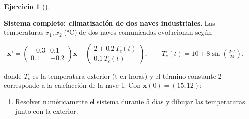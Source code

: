 \documentclass[
  spanish,
  a4paper,
]{scrreport}
\theoremstyle{definition}
\newtheorem{exercise}{Ejercicio}[chapter]
\theoremstyle{remark}
\begin{document}
\begin{exercise}[]\protect\hypertarget{exr-sistema-completo-climatizacion}{}\label{exr-sistema-completo-climatizacion}

\textbf{Sistema completo: climatización de dos naves industriales.} Las
temperaturas \(x_1, x_2\) (°C) de dos naves comunicadas evolucionan
según

\[
\mathbf{x}' = \begin{pmatrix} -0.3 & 0.1 \\ 0.1 & -0.2 \end{pmatrix} \mathbf{x}
+ \begin{pmatrix} 2 + 0.2\,T_e(t) \\ 0.1\,T_e(t) \end{pmatrix},
\qquad T_e(t) = 10 + 8\sin\!\left(\tfrac{2\pi t}{24}\right),
\]

donde \(T_e\) es la temperatura exterior (t en horas) y el término
constante 2 corresponde a la calefacción de la nave 1. Con
\(\mathbf{x}(0) = (15, 12)\):

\begin{enumerate}
\def\labelenumi{\alph{enumi}.}
\item
  Resolver numéricamente el sistema durante 5 días y dibujar las
  temperaturas junto con la exterior.

  \begin{tcolorbox}[enhanced jigsaw, arc=.35mm, bottomrule=.15mm, bottomtitle=1mm, breakable, colback=white, colbacktitle=quarto-callout-tip-color!10!white, colframe=quarto-callout-tip-color-frame, coltitle=black, left=2mm, leftrule=.75mm, opacityback=0, opacitybacktitle=0.6, rightrule=.15mm, title=\textcolor{quarto-callout-tip-color}{\faLightbulb}\hspace{0.5em}{Solución}, titlerule=0mm, toprule=.15mm, toptitle=1mm]


\end{tcolorbox}
\end{enumerate}
\end{exercise}
\end{document}
